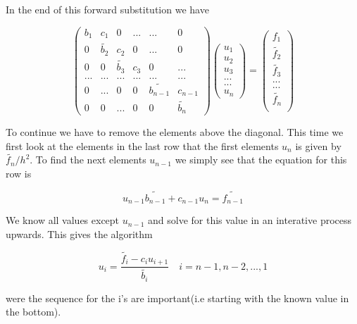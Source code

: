 \documentclass[a4paper,11pt]{article}
\begin{document}
{In the end of this forward substitution we have

\begin{equation}
	\begin{pmatrix}
		b_1 & c_1 & 0 & ... & ... & 0 \\
		0 & \tilde{b_2} & c_2 & 0 & ... & 0 \\
		0 & 0 & \tilde{b_3} & c_3 & 0 & ... \\
		... & ... & ... & ... & ... & ... \\
		0 & ... & 0 & 0 & \tilde{b_{n-1}} & c_{n-1} \\
		0 & 0 & ... & 0 & 0 & \tilde{b_{n}}
	\end{pmatrix} \begin{pmatrix}
	u_1\\
	u_2\\
	u_3\\
	...\\
	...\\
	u_n
\end{pmatrix} = \begin{pmatrix}
f_1 \\
\tilde{f_2} \\
\tilde{f_3} \\
... \\
... \\
\tilde{f_n} \\
\end{pmatrix}
\end{equation}

To continue we have to remove the elements above the diagonal. This time we first look at the elements in the last row that the first elements $u_n$ is given by $\tilde{f_n}/h^2$. To find the next elements $u_{n-1}$ we simply see that the equation for this row is 

\begin{equation}
	u_{n-1}\tilde{b_{n-1}}+c_{n-1}u_n = \tilde{f_{n-1}}
\end{equation}

We know all values except $u_{n-1}$ and solve for this value in an interative process upwards. This gives the algorithm 

\begin{equation}
	u_i = \frac{\tilde{f_i}-c_i u_{i+1}}{\tilde{b_i}}\quad i = n-1, n-2, ..., 1
	\label{eq:forward_general_u}
\end{equation}

were the sequence for the i's are important(i.e starting with the known value in the bottom). 

}
\end{document}
